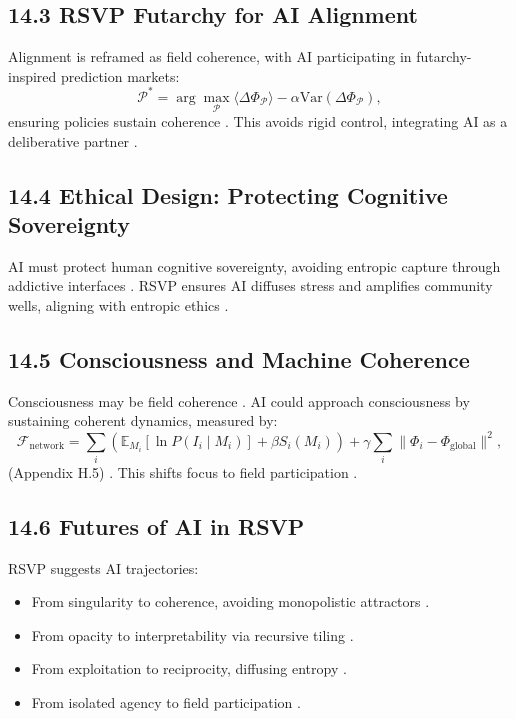 \documentclass[12pt]{article}
\begin{document}
\subsection*{14.3 RSVP Futarchy for AI Alignment}
Alignment is reframed as field coherence, with AI participating in futarchy-inspired prediction markets:
\[
\mathcal{P}^* = \arg \max_{\mathcal{P}} \langle \Delta \Phi_{\mathcal{P}} \rangle - \alpha \mathrm{Var}(\Delta \Phi_{\mathcal{P}}),
\]
ensuring policies sustain coherence \citep{hanson2003}. This avoids rigid control, integrating AI as a deliberative partner \citep{friston2010}.

\subsection*{14.4 Ethical Design: Protecting Cognitive Sovereignty}
AI must protect human cognitive sovereignty, avoiding entropic capture through addictive interfaces \citep{lanier2018}. RSVP ensures AI diffuses stress and amplifies community wells, aligning with entropic ethics \citep{ortega1957}.

\subsection*{14.5 Consciousness and Machine Coherence}
Consciousness may be field coherence \citep{tononi2004}. AI could approach consciousness by sustaining coherent dynamics, measured by:
\[
\mathcal{F}_{\text{network}} = \sum_i \left( \mathbb{E}_{M_i}[\ln P(I_i \mid M_i)] + \beta S_i(M_i) \right) + \gamma \sum_i \|\Phi_i - \Phi_{\text{global}}\|^2,
\]
(Appendix H.5) \citep{friston2010}. This shifts focus to field participation \citep{whitehead1978}.

\subsection*{14.6 Futures of AI in RSVP}
RSVP suggests AI trajectories:
\begin{itemize}
    \item From singularity to coherence, avoiding monopolistic attractors \citep{zuboff2019}.
    \item From opacity to interpretability via recursive tiling \citep{milewski2018}.
    \item From exploitation to reciprocity, diffusing entropy \citep{lanier2018}.
    \item From isolated agency to field participation \citep{deleuze1987}.
\end{itemize}
\end{document}
